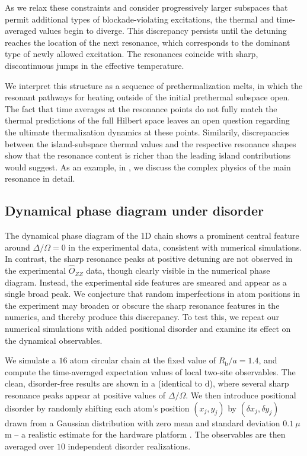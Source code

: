 \documentclass[english,floatfix,twocolumn,showpacs, aps, prx, reprint, superscriptaddress, longbibliography]{revtex4-2}
\begin{document}
As we relax these constraints and consider progressively larger subspaces that permit additional types of blockade-violating excitations, the thermal and time-averaged values begin to diverge. This discrepancy persists until the detuning reaches the location of the next resonance, which corresponds to the dominant type of newly allowed excitation. The resonances coincide with sharp, discontinuous jumps in the effective temperature.

We interpret this structure as a sequence of prethermalization melts, in which the resonant pathways for heating outside of the initial prethermal subspace open. The fact that time averages at the resonance points do not fully match the thermal predictions of the full Hilbert space leaves an open question regarding the ultimate thermalization dynamics at these points. Similarily, discrepancies between the island-subspace thermal values and the respective resonance shapes show that the resonance content is richer than the leading island contributions would suggest. As an example, in , we discuss the complex physics of the main resonance in detail.


\subsection{Dynamical phase diagram under disorder}
\label{supp:subsec:DPTs_1D_disorder}

The dynamical phase diagram of the 1D chain shows a prominent central feature around $\Delta / \Omega = 0$ in the experimental data, consistent with numerical simulations. In contrast, the sharp resonance peaks at positive detuning are not observed in the experimental $\hat{O}_{ZZ}$ data, though clearly visible in the numerical phase diagram. Instead, the experimental side features are smeared and appear as a single broad peak. We conjecture that random imperfections in atom positions in the experiment may broaden or obscure the sharp resonance features in the numerics, and thereby produce this discrepancy. To test this, we repeat our numerical simulations with added positional disorder and examine its effect on the dynamical observables.

We simulate a $16$ atom circular chain at the fixed value of $R_\mathrm{b} / a = 1.4$, and compute the time-averaged expectation values of local two-site observables. The clean, disorder-free results are shown in a (identical to d), where several sharp resonance peaks appear at positive values of $\Delta / \Omega$. We then introduce positional disorder by randomly shifting each atom’s position $(x_j, y_j)$ by $(\delta x_j, \delta y_j)$ drawn from a Gaussian distribution with zero mean and standard deviation $0.1~\mu$m -- a realistic estimate for the hardware platform \cite{aquila:2023}. The observables are then averaged over $10$ independent disorder realizations. 
\end{document}
